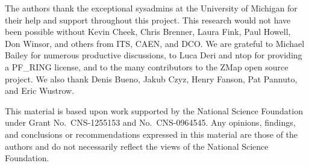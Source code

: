 The authors thank the exceptional sysadmins at the University of Michigan for
their help and support throughout this project. This research would not have
been possible without Kevin Cheek, Chris Brenner, Laura Fink, Paul Howell,
Don Winsor, and others from ITS, CAEN, and DCO\@. We are grateful to Michael
Bailey for numerous productive discussions, to Luca Deri and ntop for
providing a PF\_RING license, and to the many contributors to the ZMap open
source project. We also thank Denis Bueno, Jakub Czyz, Henry Fanson, Pat
Pannuto, and Eric Wustrow.

This material is based upon work supported by the National Science Foundation
under Grant No.~CNS-1255153 and No.~CNS-0964545. Any opinions, findings, and
conclusions or recommendations expressed in this material are those of the
authors and do not necessarily reflect the views of the National Science
Foundation.

